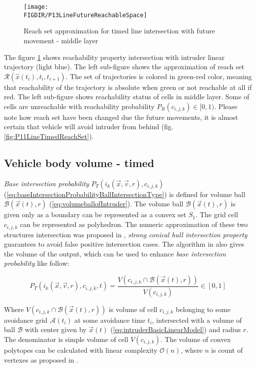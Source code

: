 \begin{figure}[H]
    \centering
    \texttt{[image: \\FIGDIR/P13LineFutureReachableSpace]}
    \caption{Reach set approximation for timed line intersection with future movement - middle layer}
    \label{fig:P13LineFutureReachableSpace}
\end{figure}

\noindent The figure \ref{fig:P13LineFutureReachableSpace} shows reachability property intersection with intruder linear trajectory (light blue). The left sub-figure shows the approximation of reach set $\mathscr{R}(\hat{x}(t_i),t_i,t_{i+1})$. The set of trajectories is colored in green-red color, meaning that reachability of the trajectory is absolute when green or not reachable at all if red. The left sub-figure shows reachability status of cells in middle layer. Some of cells are unreachable with reachability probability $P_R(c_{i,j,k})\in [0,1)$. Please note how reach set have been changed due the future movements, it is almost certain that vehicle will avoid intruder from behind (fig. \ref{fig:P11LineTimedReachSet}).


\subsection{Vehicle body volume - timed}
\noindent\emph{Base intersection probability} $P_T(i_k(\vec{x},\vec{v},r),c_{i,j,k})$ (\ref{eq:baseIntersectionProbabilityBallIntersectionType}) is defined for volume ball $\mathscr{B}(\vec{x}(t),r)$ (\ref{eq:volumeballofIntruder}). The volume ball 
$\mathscr{B}(\vec{x}(t),r)$ is given only as a boundary can be represented as a convex set $S_1$. The grid cell $c_{i,j,k}$ can be represented as polyhedron. The numeric approximation of these two structures intersection was proposed in \cite{deutsch1999best}, \emph{strong conical hull intersection property} guarantees to avoid false positive intersection cases. The algorithm in \cite{deutsch1999best} also gives the volume of the output, which can be used to enhance  \emph{base intersection probability} like follow:

\begin{equation}
    P_T(i_k(\vec{x},\vec{v},r),c_{i,j,k},t)= \frac{V(c_{i,j,k}\cap \mathscr{B}(\vec{x}(t),r))}{V(c_{i,j,k})} \in [0,1]
\end{equation}

\noindent Where $V(c_{i,j,k}\cap \mathscr{B}(\vec{x}(t),r))$ is volume of cell $c_{i,j,k}$ belonging to some avoidance grid $\mathscr{A}(t_i)$ at some avoidance time $t_i$, intersected with a volume of ball $\mathscr{B}$ with center given by $\vec{x}(t)$ (\ref{eq:intruderBasicLinearModel}) and radius $r$. The denominator is simple volume of cell $V(c_{i,j,k})$. The volume of convex polytopes can be calculated with linear complexity $\mathscr{O}(n)$, where $n$ is count of vertexes as proposed in \cite{lawrence1991polytope}.

